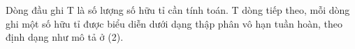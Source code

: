 Dòng đầu ghi T là số lượng số hữu tỉ cần tính toán. T dòng tiếp theo, mỗi dòng ghi một số hữu tỉ được biểu diễn dưới dạng thập phân vô hạn tuần hoàn, theo định dạng như mô tả ở (2).